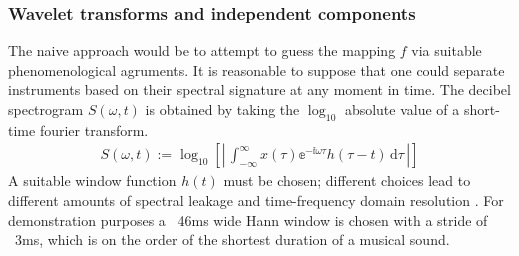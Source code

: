 \documentclass{article}[12pt]
\numberwithin{equation}{section}
\begin{document}
\subsubsection{Wavelet transforms and independent components}
The naive approach would be to attempt to guess the mapping $f$ via suitable
phenomenological agruments. It is reasonable to suppose that one could separate
instruments based on their spectral signature at any moment in time. The decibel
spectrogram $S(\omega,t)$ is obtained by taking the $\log_{10}$ absolute value
of a short-time fourier transform.
\begin{align}
	S(\omega,t):=\log_{10}\left[\left|\,
	\int_{-\infty}^{\infty}\!
		x(\tau)\mathbb{e}^{-\mathbb{i}\omega \tau}h(\tau-t)
	\,\mathrm{d}\tau
	\,\right|\right]
\end{align}
A suitable window function $h(t)$ must be chosen; different choices lead to
different amounts of spectral leakage and time-frequency domain resolution
\cite{}. For demonstration purposes a ~46ms wide Hann window is chosen with a
stride of ~3ms, which is on the order of the shortest duration of a musical
sound.
\end{document}
